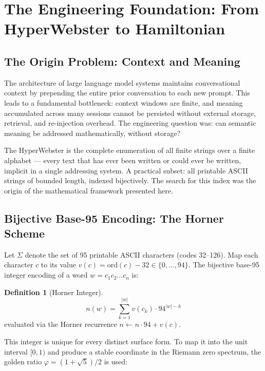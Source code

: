 \documentclass[12pt,a4paper]{article}
\theoremstyle{definition}
\newtheorem{definition}[theorem]{Definition}
\theoremstyle{remark}
\begin{document}
\newpage
\tableofcontents
\newpage

\section{The Engineering Foundation: From HyperWebster to Hamiltonian}

\subsection{The Origin Problem: Context and Meaning}

The architecture of large language model systems maintains conversational context
by prepending the entire prior conversation to each new prompt.
This leads to a fundamental bottleneck: context windows are finite, and meaning accumulated
across many sessions cannot be persisted without external storage, retrieval, and
re-injection overhead.
The engineering question was: can semantic meaning be addressed mathematically, without storage?

The HyperWebster is the complete enumeration of all finite strings over a finite alphabet
--- every text that has ever been written or could ever be written, implicit in a single
addressing system.
A practical subset: all printable ASCII strings of bounded length, indexed bijectively.
The search for this index was the origin of the mathematical framework presented here.

\subsection{Bijective Base-95 Encoding: The Horner Scheme}

Let $\Sigma$ denote the set of 95 printable ASCII characters (codes 32--126).
Map each character $c$ to its value $v(c) = \mathrm{ord}(c) - 32 \in \{0,\ldots,94\}$.
The bijective base-95 integer encoding of a word $w = c_1 c_2 \ldots c_n$ is:

\begin{definition}[Horner Integer]
\[
n(w) = \sum_{k=1}^{|w|} v(c_k)\cdot 94^{|w|-k}
\]
evaluated via the Horner recurrence $n \leftarrow n\cdot 94 + v(c)$.
\end{definition}

This integer is unique for every distinct surface form.
To map it into the unit interval $[0,1)$ and produce a stable coordinate in the
Riemann zero spectrum, the golden ratio $\varphi = (1+\sqrt{5})/2$ is used:
\end{document}
